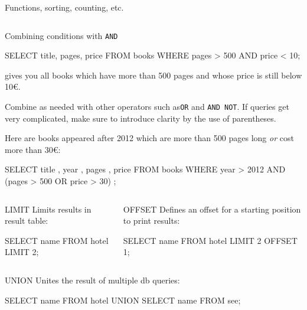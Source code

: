 \begin{frame}{Functions, sorting, counting, etc.}
\begin{columns}
\begin{block}{Combining conditions with \texttt{AND}} 
\begin{sqlcode}
SELECT title, pages, price
FROM books
WHERE pages > 500 AND price < 10;
\end{sqlcode}
{\scriptsize
gives you all books which have more than 500 pages and whose price is still below 10€.

Combine as needed with other operators such as\texttt{OR} and \texttt{AND NOT}. 
If queries get very complicated, make sure to introduce clarity by the use of parentheses.

Here are books appeared after 2012 which are more than 500 pages long \emph{or} cost more than 30€:
}
\begin{sqlcode}
SELECT title , year , pages , price
FROM books
WHERE year > 2012 
AND (pages > 500 OR price > 30) ;
\end{sqlcode}
\end{block}
\end{columns}

\begin{columns}
\begin{block}{LIMIT}\small
Limits results in result table:
\begin{sqlcode}
SELECT name FROM hotel 
LIMIT 2;
\end{sqlcode}
\end{block}

\begin{block}{OFFSET}\small
Defines an offset for a starting position to print results: 
\begin{sqlcode}
SELECT name FROM hotel 
LIMIT 2 OFFSET 1;
\end{sqlcode}
\end{block}
\end{columns}

\begin{block}{UNION}\small
Unites the result of multiple db queries:
\begin{sqlcode}
SELECT name FROM hotel 
UNION SELECT name FROM see;
\end{sqlcode}
\end{block}
\end{frame}







